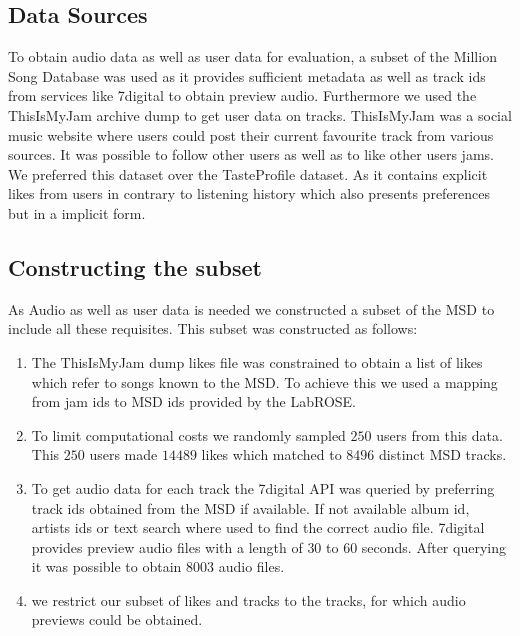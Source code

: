 \documentclass[cic,tc,english]{iiufrgs}
\begin{document}
\subsection{Data Sources}
To obtain audio data as well as user data for evaluation, a subset of the Million Song Database \cite{Bertin-Mahieux2011} was used as it provides sufficient metadata as well as track ids from services like 7digital to obtain preview audio. Furthermore we used the ThisIsMyJam archive dump\cite{janssonmy} to get user data on tracks. ThisIsMyJam was a social music website where users could post their current favourite track from various sources. It was possible to follow other users as well as to like other users jams. We preferred this dataset over the TasteProfile dataset. As it contains explicit likes from users in contrary to listening history which also presents preferences but in a implicit form.

\subsection{Constructing the subset}
As Audio as well as user data is needed we constructed a subset of the MSD to include all these requisites. This subset was constructed as follows:

\begin{enumerate}

\item The ThisIsMyJam dump likes file was constrained to obtain a list of likes which refer to songs known to the MSD. To achieve this we used a mapping from jam ids to MSD ids provided by the LabROSE.

\item To limit computational costs we randomly sampled $250$ users from this data. This $250$ users made $14489$ likes which matched to $8496$ distinct MSD tracks.

\item  To get audio data for each track the 7digital API was queried by preferring track ids obtained from the MSD if available. If not available album id, artists ids or text search where used to find the correct audio file. 7digital provides preview audio files with a length of $30$ to $60$ seconds. After querying it was possible to obtain $8003$ audio files.

\item we restrict our subset of likes and tracks to the tracks, for which audio previews could be obtained.

\end{enumerate}
\end{document}
